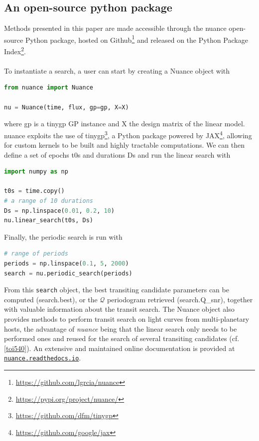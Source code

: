 \documentclass[modern]{aastex631}
\newcommand{\nuancemethod}{\textit{nuance}}
\newcommand{\nuancecode}{\textsf{nuance}}
\newcommand{\footlink}[1]{\footnote{\url{#1}}}
\begin{document}
\subsection{An open-source python package}
Methods presented in this paper are made accessible through the \nuancecode{} open-source Python package, hosted on Github\footnote{\href{https://github.com/lgrcia/nuance}{https://github.com/lgrcia/nuance}} and released on the Python Package Index\footlink{https://pypi.org/project/nuance/}. 
\\\\
To instantiate a search, a user can start by creating a \textsf{Nuance} object with
\begin{lstlisting}[language=Python]
from nuance import Nuance

nu = Nuance(time, flux, gp=gp, X=X)
\end{lstlisting}
where \textsf{gp} is a \textsf{tinygp} GP instance and \textsf{X} the design matrix of the linear model. \textsf{nuance} exploits the use of \textsf{tinygp}\footnote{\href{https://github.com/dfm/tinygp}{https://github.com/dfm/tinygp}}, a Python package powered by \textsf{JAX}\footnote{\href{https://github.com/google/jax}{https://github.com/google/jax}}, allowing for custom kernels to be built and highly tractable computations. We can then define a set of epochs \textsf{t0s} and durations \textsf{Ds} and run the linear search with
\begin{lstlisting}[language=Python,linewidth=\linewidth]
import numpy as np

t0s = time.copy()
# a range of 10 durations
Ds = np.linspace(0.01, 0.2, 10)
nu.linear_search(t0s, Ds)
\end{lstlisting}
Finally, the periodic search is run with
\begin{lstlisting}[language=Python]
# range of periods
periods = np.linspace(0.1, 5, 2000)
search = nu.periodic_search(periods)
\end{lstlisting}
From this \texttt{search} object, the best transiting candidate parameters can be computed (\textsf{search.best}), or the $\mathcal{Q}$ periodogram retrieved (\textsf{search.Q\_snr}), together with valuable information about the transit search. The \textsf{Nuance} object also provides methods to perform transit search on light curves from multi-planetary hosts, the advantage of \nuancemethod{} being that the linear search only needs to be performed ones and reused for the search of several transiting candidates (cf.\;\autoref{toi540}). An extensive and maintained online documentation is provided at \href{https://nuance.readthedocs.io}{\texttt{nuance.readthedocs.io}}.
\end{document}

